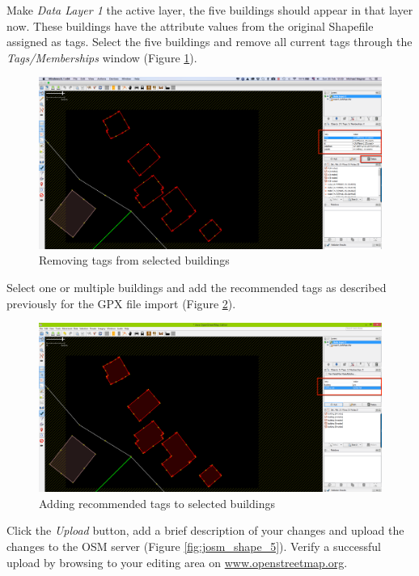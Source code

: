 \documentclass[a4paper,12pt,titlepage]{article}
\begin{document}
Make \textit{Data Layer 1} the active layer, the five buildings should appear in that layer now. These buildings have the attribute values from the original Shapefile assigned as tags. Select the five buildings and remove all current tags through the \textit{Tags/Memberships} window (Figure \ref{fig:josm_shape_3}).

\begin{figure}[H]
	\centering
	\includegraphics[width=12cm]{Images/josm_shape_3.png}
	\caption{Removing tags from selected buildings}\label{fig:josm_shape_3}
\end{figure}

Select one or multiple buildings and add the recommended tags as described previously for the GPX file import (Figure \ref{fig:josm_shape_4}).

\begin{figure}[H]
	\centering
	\includegraphics[width=12cm]{Images/josm_shape_4.png}
	\caption{Adding recommended tags to selected buildings}\label{fig:josm_shape_4}
\end{figure}

Click the \textit{Upload} button, add a brief description of your changes and upload the changes to the OSM server (Figure \ref{fig:josm_shape_5}). Verify a successful upload by browsing to your editing area on \url{www.openstreetmap.org}.
\end{document}
